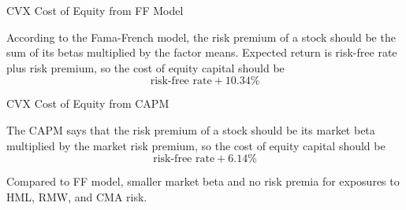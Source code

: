\documentclass[xcolor=dvipsnames,10pt]{beamer}
\begin{document}
\begin{frame}{CVX Cost of Equity from FF Model}
    \begin{center}
        
    \end{center}
According to the Fama-French model, the risk premium of a stock should be the sum of its betas multiplied by the factor means.  Expected return is risk-free rate plus risk premium, so the cost of equity capital should be
$$\text{risk-free rate} + 10.34\%$$
\end{frame}

\begin{frame}{CVX Cost of Equity from CAPM}
     \begin{center}
        
    \end{center}
The CAPM says that the risk premium of a stock should be its market beta multiplied by the market risk premium, so the cost of equity capital should be
$$\text{risk-free rate} + 6.14\%$$

Compared to FF model, smaller market beta and no risk premia for exposures to HML, RMW, and CMA risk.
\end{frame}
\end{document}

